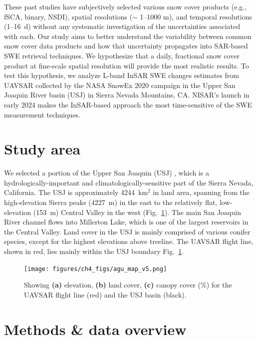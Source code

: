 These past studies have subjectively selected various snow cover products (e.g., fSCA, binary, NSDI), spatial resolutions ($\sim$ 1--1000 m), and temporal resolutions (1--16~d) without any systematic investigation of the uncertainties associated with each. Our study aims to better understand the variability between common snow cover data products and how that uncertainty propagates into SAR-based SWE retrieval techniques. We hypothesize that a daily, fractional snow cover product at fine-scale spatial resolution will provide the most realistic results. To test this hypothesis, we analyze L-band InSAR SWE changes estimates from UAVSAR collected by the NASA SnowEx 2020 \cite{marshallNASASnowEx20202019} campaign in the Upper San Joaquin River basin (USJ) in Sierra Nevada Mountains, CA. NISAR's launch in early 2024 makes the InSAR-based approach the most time-sensitive of the SWE measurement techniques.


\hypertarget{ch4-methods}{\section{Study area}\label{ch4-methods}}

We selected a portion of the Upper San Joaquin (USJ) , which is a hydrologically-important and climatologically-sensitive part of the Sierra Nevada, California. The USJ is approximately 4244~km$^{2}$ in land area, spanning from the high-elevation Sierra peaks (4227~m) in the east to the relatively flat, low-elevation (153~m) Central Valley in the west (Fig.~\ref{fig:multisensor_study_area}). The main San Joaquin River channel flows into Millerton Lake, which is one of the largest reservoirs in the Central Valley. Land cover in the USJ is mainly comprised of various conifer species, except for the highest elevations above treeline. The UAVSAR flight line, shown in red, lies mainly within the USJ boundary Fig.~\ref{fig:multisensor_study_area}.

\begin{figure}[ht]
\texttt{[image: figures/ch4\_figs/agu\_map\_v5.png]}
\centering
\caption{Showing \textbf{(a)} elevation, \textbf{(b)} land cover, \textbf{(c)} canopy cover (\%) for the UAVSAR flight line (red) and the USJ basin (black).}
\label{fig:multisensor_study_area}
\end{figure}
\clearpage

\hypertarget{ch4-methods}{\section{Methods \& data overview}\label{ch4-methods}}


